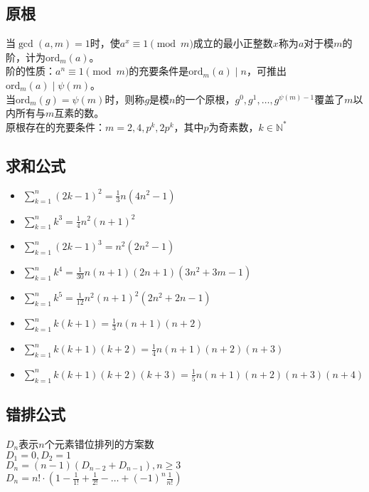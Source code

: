 	\subsection*{原根}
		当$ \gcd(a, m) = 1 $时，使$ a^x \equiv 1 \pmod m $成立的最小正整数$ x $称为$ a $对于模$ m $的阶，计为$ \text{ord}_m(a) $。
		\\阶的性质：$ a^n \equiv 1 \pmod m $的充要条件是$ \text{ord}_m(a) \mid n $，可推出$ \text{ord}_m(a) \mid \psi(m) $。
		\\当$ \text{ord}_m(g) = \psi(m) $时，则称$ g $是模$ n $的一个原根，$ g^0, g^1, \dots, g^{\psi(m) - 1} $覆盖了$ m $以内所有与$ m $互素的数。
		\\原根存在的充要条件：$ m = 2, 4, p^k, 2 p^k $，其中$ p $为奇素数，$ k \in \mathbb{N}^\ast $
	\subsection*{求和公式}
		\begin{itemize}[wide=0pt]
			\item $ \sum\limits_{k=1}^{n} (2k - 1)^2 = \frac{1}{3} n(4n^2 - 1) $
			\item $ \sum\limits_{k=1}^{n} k^3 = \frac{1}{4} n^2(n + 1)^2 $
			\item $ \sum\limits_{k=1}^{n} (2k - 1)^3 = n^2(2n^2 - 1) $
			\item $ \sum\limits_{k=1}^{n} k^4 = \frac{1}{30} n(n + 1) (2n + 1) (3n^2 + 3m - 1) $
			\item $ \sum\limits_{k=1}^{n} k^5 = \frac{1}{12} n^2(n + 1)^2(2n^2 + 2n - 1) $
			\item $ \sum\limits_{k=1}^{n} k(k + 1) = \frac{1}{3} n(n + 1)(n + 2) $
			\item $ \sum\limits_{k=1}^{n} k(k + 1)(k + 2) = \frac{1}{4} n(n + 1)(n + 2)(n + 3) $
			\item $ \sum\limits_{k=1}^{n} k(k + 1)(k + 2)(k + 3) = \frac{1}{5} n(n + 1)(n + 2)(n + 3)(n + 4) $
		\end{itemize}
	\subsection*{错排公式}
		$ D_n $表示$ n $个元素错位排列的方案数
		\\$ D_1 = 0, D_2 = 1 $
		\\$ D_n = (n - 1)(D_{n - 2} + D_{n - 1}), n \geq 3 $
		\\$ D_n = n! \cdot (1 - \frac{1}{1!} + \frac{1}{2!} - \dots + (-1)^n\frac{1}{n!}) $
